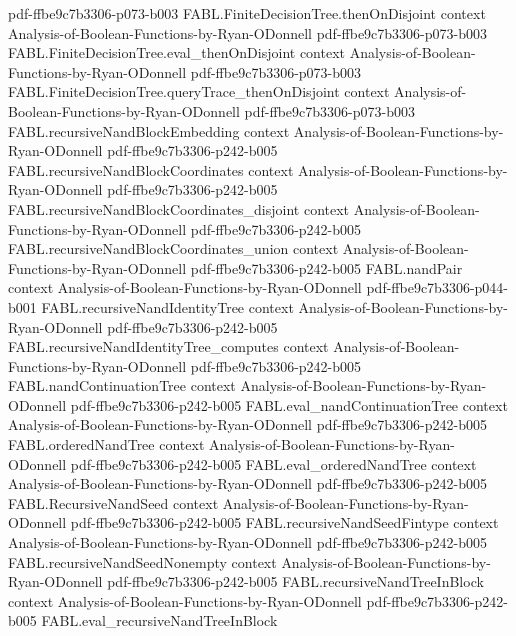 \begin{theorem}
  {pdf-ffbe9c7b3306-p073-b003}
\proofstep
  {FABL.FiniteDecisionTree.thenOnDisjoint}
  {context}
  {Analysis-of-Boolean-Functions-by-Ryan-ODonnell}
  {pdf-ffbe9c7b3306-p073-b003}
\proofstep
  {FABL.FiniteDecisionTree.eval_thenOnDisjoint}
  {context}
  {Analysis-of-Boolean-Functions-by-Ryan-ODonnell}
  {pdf-ffbe9c7b3306-p073-b003}
\proofstep
  {FABL.FiniteDecisionTree.queryTrace_thenOnDisjoint}
  {context}
  {Analysis-of-Boolean-Functions-by-Ryan-ODonnell}
  {pdf-ffbe9c7b3306-p073-b003}
\proofstep
  {FABL.recursiveNandBlockEmbedding}
  {context}
  {Analysis-of-Boolean-Functions-by-Ryan-ODonnell}
  {pdf-ffbe9c7b3306-p242-b005}
\proofstep
  {FABL.recursiveNandBlockCoordinates}
  {context}
  {Analysis-of-Boolean-Functions-by-Ryan-ODonnell}
  {pdf-ffbe9c7b3306-p242-b005}
\proofstep
  {FABL.recursiveNandBlockCoordinates_disjoint}
  {context}
  {Analysis-of-Boolean-Functions-by-Ryan-ODonnell}
  {pdf-ffbe9c7b3306-p242-b005}
\proofstep
  {FABL.recursiveNandBlockCoordinates_union}
  {context}
  {Analysis-of-Boolean-Functions-by-Ryan-ODonnell}
  {pdf-ffbe9c7b3306-p242-b005}
\proofstep
  {FABL.nandPair}
  {context}
  {Analysis-of-Boolean-Functions-by-Ryan-ODonnell}
  {pdf-ffbe9c7b3306-p044-b001}
\proofstep
  {FABL.recursiveNandIdentityTree}
  {context}
  {Analysis-of-Boolean-Functions-by-Ryan-ODonnell}
  {pdf-ffbe9c7b3306-p242-b005}
\proofstep
  {FABL.recursiveNandIdentityTree_computes}
  {context}
  {Analysis-of-Boolean-Functions-by-Ryan-ODonnell}
  {pdf-ffbe9c7b3306-p242-b005}
\proofstep
  {FABL.nandContinuationTree}
  {context}
  {Analysis-of-Boolean-Functions-by-Ryan-ODonnell}
  {pdf-ffbe9c7b3306-p242-b005}
\proofstep
  {FABL.eval_nandContinuationTree}
  {context}
  {Analysis-of-Boolean-Functions-by-Ryan-ODonnell}
  {pdf-ffbe9c7b3306-p242-b005}
\proofstep
  {FABL.orderedNandTree}
  {context}
  {Analysis-of-Boolean-Functions-by-Ryan-ODonnell}
  {pdf-ffbe9c7b3306-p242-b005}
\proofstep
  {FABL.eval_orderedNandTree}
  {context}
  {Analysis-of-Boolean-Functions-by-Ryan-ODonnell}
  {pdf-ffbe9c7b3306-p242-b005}
\proofstep
  {FABL.RecursiveNandSeed}
  {context}
  {Analysis-of-Boolean-Functions-by-Ryan-ODonnell}
  {pdf-ffbe9c7b3306-p242-b005}
\proofstep
  {FABL.recursiveNandSeedFintype}
  {context}
  {Analysis-of-Boolean-Functions-by-Ryan-ODonnell}
  {pdf-ffbe9c7b3306-p242-b005}
\proofstep
  {FABL.recursiveNandSeedNonempty}
  {context}
  {Analysis-of-Boolean-Functions-by-Ryan-ODonnell}
  {pdf-ffbe9c7b3306-p242-b005}
\proofstep
  {FABL.recursiveNandTreeInBlock}
  {context}
  {Analysis-of-Boolean-Functions-by-Ryan-ODonnell}
  {pdf-ffbe9c7b3306-p242-b005}
\proofstep
  {FABL.eval_recursiveNandTreeInBlock}

\end{theorem}
